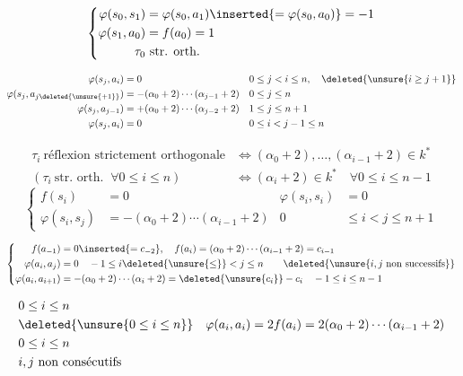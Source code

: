 \[
\left\{\begin{aligned}
\varphi(s_0,s_1)&=\varphi(s_0,a_1)\inserted{=\varphi(s_0,a_0)}=-1\\
\varphi(s_1,a_0)&=f(a_0)=1\\
\tau_0&\ \text{str. orth.}
\end{aligned}\right.
\]

\[
\begin{aligned}
\varphi(s_j,a_i)&=0 &&0\le j<i\le n,\quad\deleted{\unsure{i\geq j+1}}\\
\varphi(s_j,a_{j\deleted{\unsure{+1}}})&=-(\alpha_0+2)\cdots(\alpha_{j-1}+2)&&0\le j\le n\\
\varphi(s_j,a_{j-1})&=+(\alpha_0+2)\cdots(\alpha_{j-2}+2)&&1\le j\le n+1\\
\varphi(s_j,a_i)&=0&&0\le i<j-1\le n
\end{aligned}
\]


\[
\begin{aligned}
\tau_i\ \text{réflexion strictement orthogonale}&\iff(\alpha_0+2),\ldots,(\alpha_{i-1}+2)\in k^{*}\\
(\tau_i\ \text{str. orth. }\ \forall 0\le i\le n)&\iff(\alpha_i+2)\in k^{*}\quad\forall 0\le i\le n-1
\end{aligned}
\]
\[
\left\{\begin{aligned}
f(s_i)&=0 &\varphi(s_i,s_i)&=0\\
\varphi(s_i,s_j)&=-(\alpha_0+2)\cdots(\alpha_{i-1}+2)&0&\le i<j\le n+1
\end{aligned}\right.
\]

 
\[
\left\{\begin{aligned}
f(a_{-1})&=0\inserted{=c_{-2}},\quad f(a_i)=(\alpha_0+2)\cdots(\alpha_{i-1}+2)=c_{i-1}\\
\varphi(a_i,a_j)&=0\quad -1\le i\deleted{\unsure{\le}}<j\le n\qquad\deleted{\unsure{i,j\ \text{non successifs}}}\\
\varphi(a_i,a_{i+1})&=-(\alpha_0+2)\cdots(\alpha_i+2)=\deleted{\unsure{c_i}}-c_i\quad -1\le i\le n-1
\end{aligned}\right.
\]

\[
\begin{aligned}
&0\le i\le n\\
&\deleted{\unsure{0\le i\le n}}\quad\varphi(a_i,a_i)=2f(a_i)=2(\alpha_0+2)\cdots(\alpha_{i-1}+2)\\
&0\le i\le n\\
&i,j\ \text{non consécutifs}
\end{aligned}
\]

